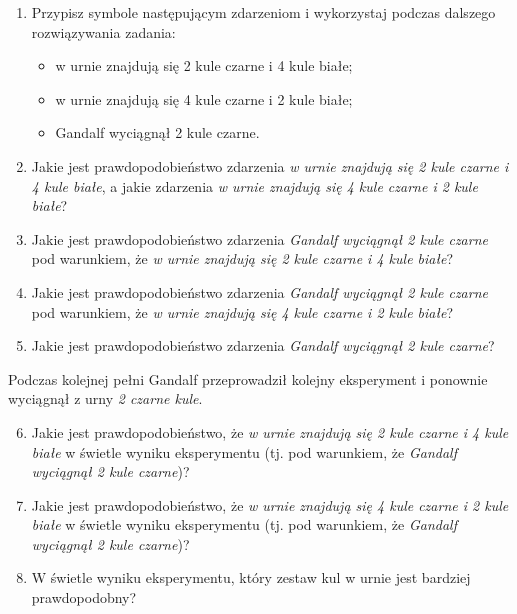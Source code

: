 \documentclass[twoside]{mwart}
\newcommand{\ans}[1]{}
\newcommand{\ans}[1]{\par\emph{Odpowiedź:} #1}
\begin{document}
\begin{enumerate}
	\begin{enumerate}
		\item Przypisz symbole następującym zdarzeniom i wykorzystaj podczas dalszego rozwiązywania zadania:
		\begin{itemize}
			\item w urnie znajdują się 2 kule czarne i 4 kule białe; \ans{$H_1$}
			\item w urnie znajdują się 4 kule czarne i 2 kule białe; \ans{$H_2$}
			\item Gandalf wyciągnął 2 kule czarne.  \ans{$E$}
		\end{itemize}
		\item Jakie jest prawdopodobieństwo  zdarzenia \emph{w urnie znajdują się 2 kule czarne i 4 kule białe}, a jakie zdarzenia \emph{w urnie znajdują się 4 kule czarne i 2 kule białe}?
		\ans{$P(H_1)=\frac{1}{7} \qquad P(H_2)=\frac{6}{7}$}
		\item Jakie jest prawdopodobieństwo  zdarzenia \emph{Gandalf wyciągnął 2 kule czarne} pod warunkiem, że \emph{w urnie znajdują się 2 kule czarne i 4 kule białe}?
		\ans{\[P(E|H_1)=\frac{1}{{6\choose 2}}=\frac{1}{15}\]}
		\item Jakie jest prawdopodobieństwo  zdarzenia \emph{Gandalf wyciągnął 2 kule czarne} pod warunkiem, że \emph{w urnie znajdują się 4 kule czarne i 2 kule białe}?
		\ans{\[P(E|H_2)=\frac{{4\choose 2}}{{6\choose 2}}=\frac{6}{15}\]}
		\item Jakie jest prawdopodobieństwo  zdarzenia \emph{Gandalf wyciągnął 2 kule czarne}?
		\ans{\[P(E)=P(E|H_1)P(H_1)+P(E|H_2)P(H_2)=\frac{1}{15}\frac{1}{7}+\frac{6}{15}\frac{6}{7}=\frac{37}{105}\]}
	\end{enumerate}
	Podczas kolejnej pełni Gandalf przeprowadził kolejny eksperyment i ponownie wyciągnął z urny \emph{2 czarne kule}.
	\begin{enumerate}
		\setcounter{enumii}{5}
		\item Jakie jest prawdopodobieństwo, że \emph{w urnie znajdują się 2 kule czarne i 4 kule białe} w świetle wyniku eksperymentu (tj. pod warunkiem, że \emph{Gandalf wyciągnął 2 kule czarne})?
		\ans{\[P(H_1|E)=\frac{P(E|H_1)P(H_1)}{P(E)}=\frac{\frac{1}{15}\frac{1}{7}}{\frac{37}{105}}=\frac{1}{37} \]}
		\item Jakie jest prawdopodobieństwo, że \emph{w urnie znajdują się 4 kule czarne i 2 kule białe} w świetle wyniku eksperymentu (tj. pod warunkiem, że \emph{Gandalf wyciągnął 2 kule czarne})?
		\ans{\[P(H_2|E)=1-P(H_1|E)=\frac{36}{37} \]}
		\item W świetle wyniku eksperymentu, który zestaw kul w urnie jest bardziej prawdopodobny?
		\ans{Bardziej prawdopodobne jest, że w urnie znajdują się 4 kule czarne i 2 kule białe}
	\end{enumerate}


\end{enumerate}
\end{document}
